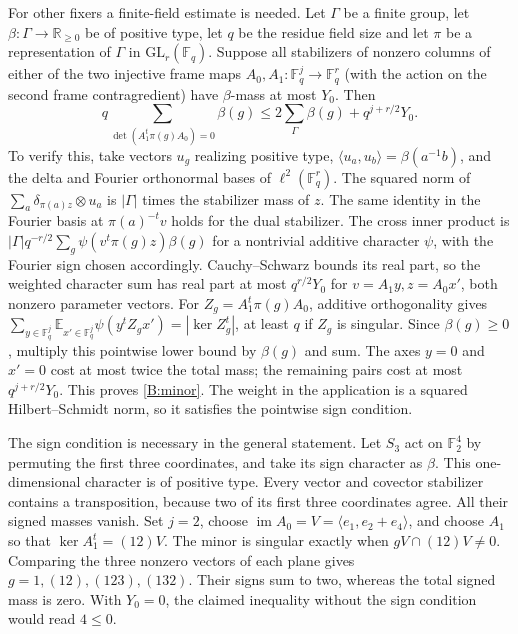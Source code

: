 For other fixers a finite-field estimate is needed.
Let \(\Gamma\) be a finite group, let \(\beta:\Gamma\to\mathbb R_{\ge0}\)
be of positive type, let \(q\) be the residue field size and let \(\pi\)
be a representation of \(\Gamma\) in \(\mathrm{GL}_r(\mathbb F_q)\).
Suppose all stabilizers of nonzero columns of either of the
two injective frame maps \(A_0,A_1:\mathbb F_q^j\to\mathbb F_q^r\)
(with the action on the second frame contragredient) have
\(\beta\)-mass at most \(Y_0\).
Then
\begin{equation}
\label{B:minor}
 q\sum_{\det(A_1^t\pi(g)A_0)=0}\beta(g)
 \le 2\sum_{\Gamma}\beta(g)+q^{j+r/2}Y_0 .
\end{equation}
To verify this, take vectors \(u_g\) realizing positive type,
\(\langle u_a,u_b\rangle=\beta(a^{-1}b)\), and the delta and
Fourier orthonormal bases of \(\ell^2(\mathbb F_q^r)\).
The squared norm of
\(\sum_a\delta_{\pi(a)z}\otimes u_a\) is \(|\Gamma|\) times
the stabilizer mass of \(z\). The same identity in the Fourier
basis at \(\pi(a)^{-t}v\) holds for the dual stabilizer.
The cross inner product is
\(|\Gamma|q^{-r/2}\sum_g\psi(v^t\pi(g)z)\beta(g)\)
for a nontrivial additive character \(\psi\), with the Fourier
sign chosen accordingly. Cauchy--Schwarz bounds its real part,
so the weighted character sum has real part at most
\(q^{r/2}Y_0\) for \(v=A_1 y,z=A_0 x'\), both nonzero
parameter vectors. For \(Z_g=A_1^t\pi(g)A_0\), additive
orthogonality gives
\(\sum_{y\in\mathbb F_q^j}\mathbb E_{x'\in\mathbb F_q^j}
  \psi(y^t Z_g x')=|\ker Z_g^t|\), at least \(q\) if
\(Z_g\) is singular. Since \(\beta(g)\ge0\), multiply this pointwise lower bound by
\(\beta(g)\) and sum. The
axes \(y=0\) and \(x'=0\) cost at most twice the total mass;
the remaining pairs cost at most \(q^{j+r/2}Y_0\).
This proves \eqref{B:minor}. The weight in the application is a squared
Hilbert--Schmidt norm, so it satisfies the pointwise sign condition.

The sign condition is necessary in the general statement. Let \(S_3\) act on
\(\mathbb F_2^4\) by permuting the first three coordinates, and take its sign
character as \(\beta\). This one-dimensional character is of positive type.
Every vector and covector stabilizer contains a transposition, because two of
its first three coordinates agree. All their signed masses vanish. Set
\(j=2\), choose \(\operatorname{im} A_0=V=\langle e_1,e_2+e_4\rangle\),
and choose \(A_1\) so that \(\ker A_1^t=(12)V\).
The minor is singular exactly when \(gV\cap(12)V\ne0\).
Comparing the three nonzero vectors of each plane gives
\(g=1,(12),(123),(132)\). Their signs sum to two, whereas the total signed
mass is zero. With \(Y_0=0\), the claimed inequality without the sign
condition would read \(4\le0\).

